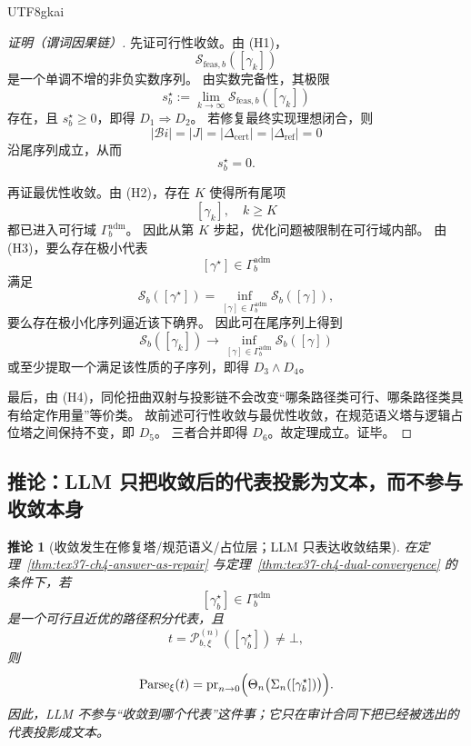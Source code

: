 \documentclass[12pt]{article}
\newtheorem{corollary}{推论}[section]
\newcommand{\Parse}{\operatorname{Parse}}
\begin{document}
\begin{CJK*}{UTF8}{gkai}
\begin{proof}[证明（谓词因果链）]
先证可行性收敛。由 \textnormal{(H1)}，
\[
  \mathcal{S}_{\mathrm{feas},b}([\gamma_k])
\]
是一个单调不增的非负实数序列。
由实数完备性，其极限
\[
  s_b^\star:=\lim_{k\to\infty}\mathcal{S}_{\mathrm{feas},b}([\gamma_k])
\]
存在，且 $s_b^\star\ge 0$，即得 $D_1\Rightarrow D_2$。
若修复最终实现理想闭合，则
\[
  |\mathcal{B}\!i|=|J|=|\Delta_{\mathrm{cert}}|=|\Delta_{\mathrm{ref}}|=0
\]
沿尾序列成立，从而
\[
  s_b^\star=0.
\]

再证最优性收敛。由 \textnormal{(H2)}，存在 $K$ 使得所有尾项
\[
  [\gamma_k],\quad k\ge K
\]
都已进入可行域 $\Gamma_b^{\mathrm{adm}}$。
因此从第 $K$ 步起，优化问题被限制在可行域内部。
由 \textnormal{(H3)}，要么存在极小代表
\[
  [\gamma^\star]\in \Gamma_b^{\mathrm{adm}}
\]
满足
\[
  \mathcal{S}_b([\gamma^\star])
  =
  \inf_{[\gamma]\in\Gamma_b^{\mathrm{adm}}}\mathcal{S}_b([\gamma]),
\]
要么存在极小化序列逼近该下确界。
因此可在尾序列上得到
\[
  \mathcal{S}_b([\gamma_k])
  \to
  \inf_{[\gamma]\in\Gamma_b^{\mathrm{adm}}}\mathcal{S}_b([\gamma])
\]
或至少提取一个满足该性质的子序列，即得 $D_3\wedge D_4$。

最后，由 \textnormal{(H4)}，同伦扭曲双射与投影链不会改变“哪条路径类可行、哪条路径类具有给定作用量”等价类。
故前述可行性收敛与最优性收敛，在规范语义塔与逻辑占位塔之间保持不变，即 $D_5$。
三者合并即得 $D_6$。故定理成立。证毕。
\end{proof}

\subsection{推论：LLM 只把收敛后的代表投影为文本，而不参与收敛本身}
\label{subsec:tex37-ch4-corollary}

\begin{corollary}[收敛发生在修复塔/规范语义/占位层；LLM 只表达收敛结果]
\label{cor:tex37-ch4-llm-projection}
在定理~\ref{thm:tex37-ch4-answer-as-repair} 与定理~\ref{thm:tex37-ch4-dual-convergence} 的条件下，若
\[
  [\gamma_b^\star]\in \Gamma_b^{\mathrm{adm}}
\]
是一个可行且近优的路径积分代表，且
\[
  t=\mathcal{P}^{(n)}_{b,\xi}([\gamma_b^\star])\neq\bot,
\]
则
\[
  \Parse_\xi(t)
  =
  \operatorname{pr}_{n\to 0}
  \Bigl(
    \Theta_n\bigl(\Sigma_n([\gamma_b^\star])\bigr)
  \Bigr).
\]
因此，LLM 不参与“收敛到哪个代表”这件事；它只在审计合同下把已经被选出的代表投影成文本。
\end{corollary}


\end{CJK*}
\end{document}
